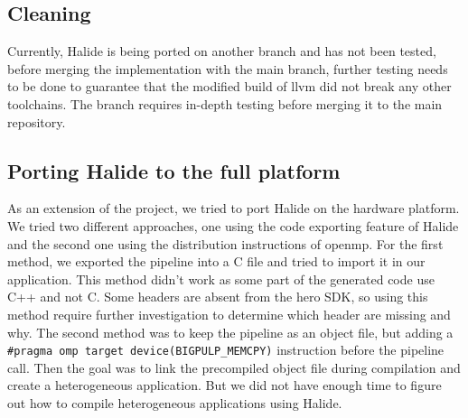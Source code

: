     \subsection{Cleaning}
        Currently, Halide is being ported on another branch and has not been tested, before merging the implementation with the main branch, further testing needs to be done to guarantee that the modified build of \gls{llvm} did not break any other toolchains.
        The branch requires in-depth testing before merging it to the main repository.

    \subsection{Porting Halide to the full platform}

    As an extension of the project, we tried to port Halide on the hardware platform.
    We tried two different approaches, one using the code exporting feature of Halide and the second one using the distribution instructions of \gls{openmp}.
    For the first method, we exported the pipeline into a C file and tried to import it in our application.
    This method didn't work as some part of the generated code use C++ and not C.
    Some headers are absent from the \gls{hero} SDK, so using this method require further investigation to determine which header are missing and why.
    The second method was to keep the pipeline as an object file, but adding a \texttt{  \#pragma omp target device(BIGPULP\_MEMCPY)} instruction before the pipeline call.
    Then the goal was to link the precompiled object file during compilation and create a heterogeneous application.
    But we did not have enough time to figure out how to compile heterogeneous applications using Halide.

